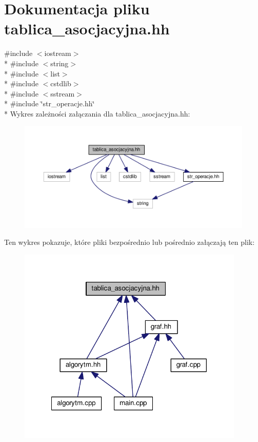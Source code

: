 \hypertarget{tablica__asocjacyjna_8hh}{\section{Dokumentacja pliku tablica\-\_\-asocjacyjna.\-hh}
\label{tablica__asocjacyjna_8hh}
}
{\ttfamily \#include $<$iostream$>$}\\*
{\ttfamily \#include $<$string$>$}\\*
{\ttfamily \#include $<$list$>$}\\*
{\ttfamily \#include $<$cstdlib$>$}\\*
{\ttfamily \#include $<$sstream$>$}\\*
{\ttfamily \#include \char`\"{}str\-\_\-operacje.\-hh\char`\"{}}\\*
Wykres zależności załączania dla tablica\-\_\-asocjacyjna.\-hh\-:\nopagebreak
\begin{figure}[H]
\begin{center}
\leavevmode
\includegraphics[width=350pt]{tablica__asocjacyjna_8hh__incl}
\end{center}
\end{figure}
Ten wykres pokazuje, które pliki bezpośrednio lub pośrednio załączają ten plik\-:\nopagebreak
\begin{figure}[H]
\begin{center}
\leavevmode
\includegraphics[width=306pt]{tablica__asocjacyjna_8hh__dep__incl}
\end{center}
\end{figure}
